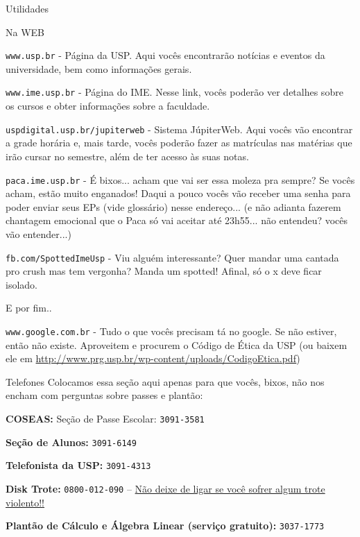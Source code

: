 \begin{secao}{Utilidades}

\begin{subsecao}{Na WEB}

{\tt www.usp.br} - Página da USP. Aqui vocês encontrarão notícias e eventos da
universidade, bem como informações gerais.

{\tt www.ime.usp.br} - Página do IME.
Nesse link, vocês poderão ver detalhes sobre os cursos e obter informações sobre
a faculdade.

{\tt uspdigital.usp.br/jupiterweb} - Sistema JúpiterWeb. Aqui vocês vão
encontrar a grade horária e, mais tarde, vocês poderão fazer as matrículas nas
matérias que irão cursar no semestre, além de ter acesso às suas notas.

{\tt paca.ime.usp.br} - É bixos... acham que vai ser essa moleza pra sempre? Se
vocês acham, estão muito enganados! Daqui a pouco vocês vão receber uma senha para
poder enviar seus EPs (vide glossário) nesse endereço... (e não adianta fazerem
chantagem emocional que o Paca só vai aceitar até 23h55... não entendeu? vocês
vão entender...)

{\tt fb.com/SpottedImeUsp} - Viu alguém interessante? Quer mandar uma cantada 
pro crush mas tem vergonha? Manda um spotted! Afinal, só o x deve ficar isolado.


E por fim..

{\tt www.google.com.br} - Tudo o que vocês precisam tá no google. Se não estiver,
então não existe. Aproveitem e procurem o Código de Ética da USP (ou baixem ele em
\url{http://www.prg.usp.br/wp-content/uploads/CodigoEtica.pdf})

\end{subsecao}

\begin{subsecao}{Telefones}
Colocamos essa seção aqui apenas para que vocês, bixos, não nos encham com perguntas
sobre passes e plantão:

{\bf COSEAS:} Seção de Passe Escolar: {\tt 3091-3581}

{\bf Seção de Alunos:} {\tt 3091-6149}

{\bf Telefonista da USP:} {\tt 3091-4313}

{\bf Disk Trote:} {\tt 0800-012-090} -- \underline{Não deixe de ligar se você sofrer algum trote violento!!}

{\bf Plantão de Cálculo e Álgebra Linear (serviço gratuito):} {\tt 3037-1773}

\end{subsecao}
\end{secao}
